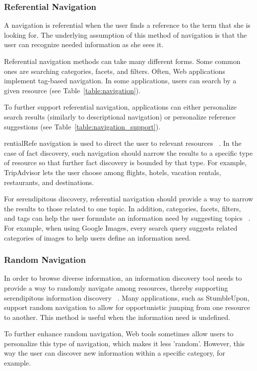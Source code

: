 {{{\subsubsection{Referential Navigation}
A navigation is referential when the user finds a reference to the term that she is looking for.  The underlying assumption of this method of navigation is that the user can recognize needed information as she sees it.

Referential navigation methods can take many different forms. Some common ones are searching categories, facets, and filters. Often, Web applications implement tag-based navigation. In some applications, users can search by a given resource (see Table~\ref{table:navigation}).

To further support referential navigation, applications can either personalize search results (similarly to descriptional navigation) or personalize reference suggestions (see Table~\ref{table:navigation_support}). 

rentialRefe navigation is used to direct the user to relevant resources ~\cite{levene}. In the case of fact discovery, such navigation should narrow the results to a specific type of resource so that further fact discovery is bounded by that type. For example, TripAdvisor lets the user choose among flights, hotels, vacation rentals, restaurants, and destinations.

For serendipitous discovery, referential navigation should provide a way to narrow the results to those related to one topic. In addition, categories, facets, filters, and tags can help the user formulate an information need by suggesting topics ~\cite{levene}. For example, when using Google Images, every search query suggests related categories of images to help users define an information need.

} %

{\subsubsection{Random Navigation}
In order to browse diverse information, an information discovery tool needs to provide a way to randomly navigate among resources, thereby supporting serendipitous information discovery ~\cite{foster}. Many applications, such as StumbleUpon, support random navigation to allow for opportunistic jumping from one resource to another. This method is useful when the information need is undefined.

To further enhance random navigation, Web tools sometimes allow users to personalize this type of navigation, which makes it less 'random'. However, this way the user can discover new information within a specific category, for example.
} %

}}
